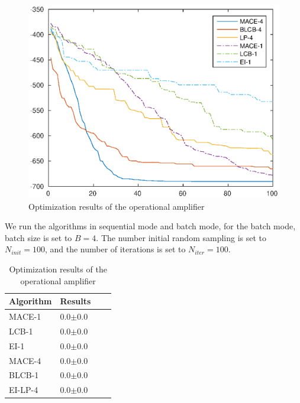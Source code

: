 \begin{figure}[]
\vskip 0.2in
\begin{center}
\centerline{\includegraphics[width=\columnwidth]{./img/mean_DAC2014.eps}}
\caption{Optimization results of the operational amplifier}
\label{fig:resDAC2014}
\end{center}
\vskip -0.2in
\end{figure}

We run the algorithms in sequential mode and batch mode, for the batch
mode, batch size is set to $B = 4$. The number initial random sampling is set
to $N_{init} = 100$, and the number of iterations is set to $N_{iter} = 100$.


\begin{table}[]
    \centering
    \caption{Optimization results of the operational amplifier}
    \label{tab:result_opamp}
    \begin{tabular}{llll}
        \toprule
        Algorithm & Results     \\ \midrule
        MACE-1    & 0.0$\pm$0.0 \\
        LCB-1     & 0.0$\pm$0.0 \\
        EI-1      & 0.0$\pm$0.0 \\
        MACE-4    & 0.0$\pm$0.0 \\
        BLCB-1    & 0.0$\pm$0.0 \\
        EI-LP-4   & 0.0$\pm$0.0 \\
        \bottomrule
    \end{tabular}
\end{table}

